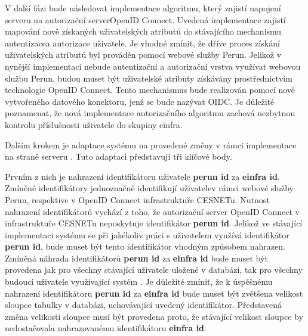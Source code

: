\documentclass[
  printed, %
  twoside, %
  table,   %
  nolof,     %
  nolot,     %
]{fithesis3}
\begin{document}
V další fázi bude následovat implementace algoritmu, který zajistí napojení serveru  na autorizační server\break OpenID Connect. Uvedená implementace zajistí mapování nově získaných uživatelských atributů do stávajícího mechanismu autentizace\break a autorizace uživatele. Je vhodné zmínit, že dříve proces získání uživatelských atributů byl prováděn pomocí webové služby Perun. Jelikož v nynější implementaci nebude autentizační a autorizační vrstva využívat webovou službu Perun, budou muset být uživatelské atributy získávány prostřednictvím technologie OpenID Connect. Tento mechanismus bude realizován pomocí nově vytvořeného datového konektoru, jenž se bude nazývat OIDC. Je důležité poznamenat, že nová implementace autorizačního algoritmu zachová nezbytnou kontrolu příslušnosti uživatele do skupiny einfra. 
\par

Dalším krokem je adaptace systému  na provedené změny v rámci implementace na straně serveru . Tuto adaptaci představují tři klíčové body. 

\par 

Prvním z nich je nahrazení identifikátoru uživatele \textbf{perun id} za \textbf{einfra id}. Zmíněné identifikátory jednoznačně identifikují uživatele\break v rámci webové služby Perun, respektive v OpenID Connect infrastruktuře CESNETu. Nutnost nahrazení identifikátorů vychází z toho, že autorizační server OpenID Connect v infrastruktuře CESNETu neposkytuje identifikátor \textbf{perun id}. Jelikož ve stávající implementaci systému  se při jakékoliv práci s uživatelem využívá identifikátor \textbf{perun id}, bude muset být tento identifikátor vhodným způsobem nahrazen. Zmíněná náhrada identifikátorů \textbf{perun id} za \textbf{einfra id} bude muset být provedena jak pro všechny stávající uživatele uložené v databázi, tak pro všechny budoucí uživatele využívající systém . Je důležité zmínit, že k úspěšnému nahrazení identifikátoru \textbf{perun id} za \textbf{einfra id} bude muset být zvětšena velikost sloupce tabulky v databázi, uchovávající uvedený identifikátor. Představená změna velikosti sloupce musí být provedena proto, že stávající velikost sloupce by nedostačovala nahrazovanému identifikátoru \textbf{einfra id}. 
\par
\end{document}
